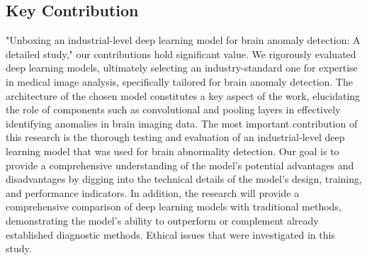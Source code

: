 \subsection{Key Contribution}
"Unboxing an industrial-level deep learning model for brain anomaly detection: A detailed study," our contributions hold significant value. We rigorously evaluated deep learning models, ultimately selecting an industry-standard one for expertise in medical image analysis, specifically tailored for brain anomaly detection. The architecture of the chosen model constitutes a key aspect of the work, elucidating the role of components such as convolutional and pooling layers in effectively identifying anomalies in brain imaging data. The most important contribution of this research is the thorough testing and evaluation of an industrial-level deep learning model that was used for brain abnormality detection. Our goal is to provide a comprehensive understanding of the model's potential advantages and disadvantages by digging into the technical details of the model's design, training, and performance indicators. In addition, the research will provide a comprehensive comparison of deep learning models with traditional methods, demonstrating the model's ability to outperform or complement already established diagnostic methods. Ethical issues that were investigated in this study. 